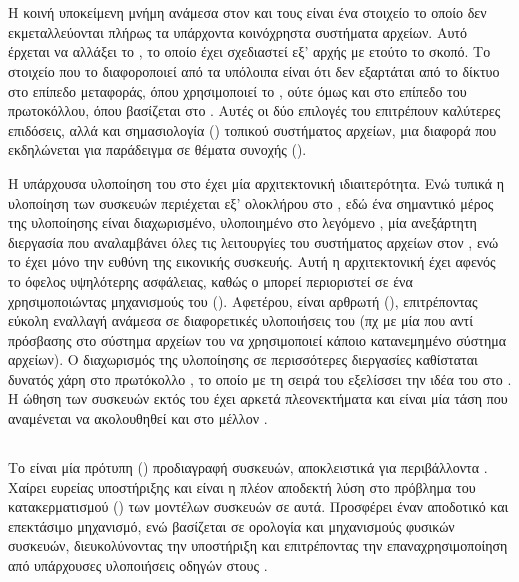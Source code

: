\section{\viofs{}}

Η κοινή υποκείμενη μνήμη ανάμεσα στον \host{} και τους  είναι ένα
στοιχείο το οποίο δεν εκμεταλλεύονται πλήρως τα υπάρχοντα κοινόχρηστα συστήματα
αρχείων. Αυτό έρχεται να αλλάξει το \viofs{} \cite{virtiofs-website}, το οποίο
έχει σχεδιαστεί εξ' αρχής με ετούτο το σκοπό. Το στοιχείο που το διαφοροποιεί
από τα υπόλοιπα είναι ότι δεν εξαρτάται από το δίκτυο στο επίπεδο μεταφοράς,
όπου χρησιμοποιεί το , ούτε όμως και στο επίπεδο του πρωτοκόλλου,
όπου βασίζεται στο . Αυτές οι δύο επιλογές του επιτρέπουν καλύτερες
επιδόσεις, αλλά και σημασιολογία () τοπικού συστήματος αρχείων,
μια διαφορά που εκδηλώνεται για παράδειγμα σε θέματα συνοχής ().

Η υπάρχουσα υλοποίηση του \viofs{} στο \qemu{} έχει μία αρχιτεκτονική
ιδιαιτερότητα. Ενώ τυπικά η υλοποίηση των συσκευών περιέχεται εξ' ολοκλήρου στο
\qemu{}, εδώ ένα σημαντικό μέρος της υλοποίησης είναι διαχωρισμένο, υλοποιημένο
στο λεγόμενο , μία ανεξάρτητη διεργασία που
αναλαμβάνει όλες τις λειτουργίες του συστήματος αρχείων στον \host{}, ενώ το
\qemu{} έχει μόνο την ευθύνη της εικονικής συσκευής. Αυτή η αρχιτεκτονική
έχει αφενός το όφελος υψηλότερης ασφάλειας, καθώς ο  μπορεί
περιοριστεί σε ένα  χρησιμοποιώντας μηχανισμούς του \host{}
(). Αφετέρου, είναι αρθρωτή (), επιτρέποντας
εύκολη εναλλαγή ανάμεσα σε διαφορετικές υλοποιήσεις του  (πχ με
μία που αντί πρόσβασης στο σύστημα αρχείων του \host{} να χρησιμοποιεί κάποιο
κατανεμημένο σύστημα αρχείων). Ο διαχωρισμός της υλοποίησης σε περισσότερες
διεργασίες καθίσταται δυνατός χάρη στο  πρωτόκολλο
\cite{vhost-user},
το οποίο με τη σειρά του εξελίσσει την ιδέα του  στο \qemu{}
\cite{stefanha:vhost}. Η ώθηση των συσκευών εκτός του  έχει αρκετά
πλεονεκτήματα και είναι μία τάση που αναμένεται να ακολουθηθεί και στο μέλλον
\cite{stefanha:out-of-process-dev}.

\subsection{}

Το  είναι μία πρότυπη () προδιαγραφή συσκευών,
αποκλειστικά για  περιβάλλοντα \cite{virtio}. Χαίρει ευρείας
υποστήριξης και είναι η πλέον αποδεκτή λύση στο πρόβλημα του κατακερματισμού
() των μοντέλων συσκευών σε αυτά. Προσφέρει έναν αποδοτικό και
επεκτάσιμο μηχανισμό, ενώ βασίζεται σε ορολογία και μηχανισμούς φυσικών
συσκευών, διευκολύνοντας την υποστήριξη και επιτρέποντας την επαναχρησιμοποίηση
από υπάρχουσες υλοποιήσεις οδηγών στους .

